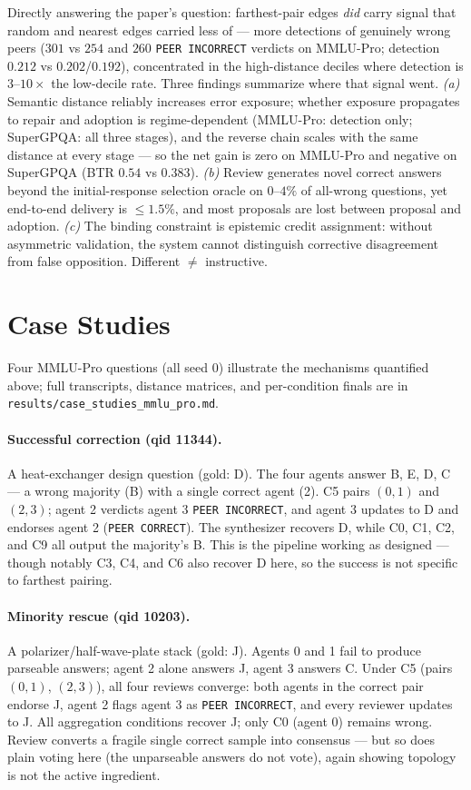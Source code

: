\documentclass[11pt]{article}
\begin{document}
Directly answering the paper's question: farthest-pair edges \emph{did} carry signal that random and nearest edges carried less of --- more detections of genuinely wrong peers ($301$ vs $254$ and $260$ \texttt{PEER INCORRECT} verdicts on MMLU-Pro; detection $0.212$ vs $0.202$/$0.192$), concentrated in the high-distance deciles where detection is $3$--$10\times$ the low-decile rate. Three findings summarize where that signal went. \emph{(a)} Semantic distance reliably increases error exposure; whether exposure propagates to repair and adoption is regime-dependent (MMLU-Pro: detection only; SuperGPQA: all three stages), and the reverse chain scales with the same distance at every stage --- so the net gain is zero on MMLU-Pro and negative on SuperGPQA (BTR $0.54$ vs $0.383$). \emph{(b)} Review generates novel correct answers beyond the initial-response selection oracle on $0$--$4\%$ of all-wrong questions, yet end-to-end delivery is $\le 1.5\%$, and most proposals are lost between proposal and adoption. \emph{(c)} The binding constraint is epistemic credit assignment: without asymmetric validation, the system cannot distinguish corrective disagreement from false opposition. Different $\neq$ instructive.

\section{Case Studies}
\label{sec:cases}

Four MMLU-Pro questions (all seed 0) illustrate the mechanisms quantified above; full transcripts, distance matrices, and per-condition finals are in \texttt{results/case\_studies\_mmlu\_pro.md}.

\paragraph{Successful correction (qid 11344).}
A heat-exchanger design question (gold: D). The four agents answer B, E, D, C --- a wrong majority (B) with a single correct agent (2). C5 pairs $(0,1)$ and $(2,3)$; agent 2 verdicts agent 3 \texttt{PEER INCORRECT}, and agent 3 updates to D and endorses agent 2 (\texttt{PEER CORRECT}). The synthesizer recovers D, while C0, C1, C2, and C9 all output the majority's B. This is the pipeline working as designed --- though notably C3, C4, and C6 also recover D here, so the success is not specific to farthest pairing.

\paragraph{Minority rescue (qid 10203).}
A polarizer/half-wave-plate stack (gold: J). Agents 0 and 1 fail to produce parseable answers; agent 2 alone answers J, agent 3 answers C. Under C5 (pairs $(0,1)$, $(2,3)$), all four reviews converge: both agents in the correct pair endorse J, agent 2 flags agent 3 as \texttt{PEER INCORRECT}, and every reviewer updates to J. All aggregation conditions recover J; only C0 (agent 0) remains wrong. Review converts a fragile single correct sample into consensus --- but so does plain voting here (the unparseable answers do not vote), again showing topology is not the active ingredient.
\end{document}
